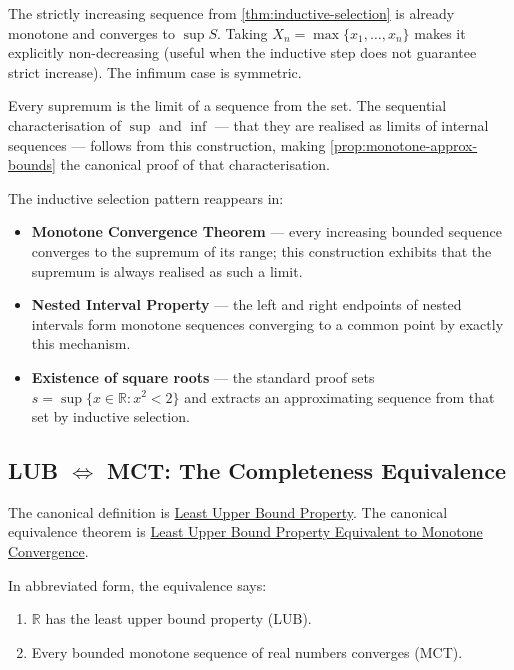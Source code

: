 \begin{remark}
The strictly increasing sequence from \cref{thm:inductive-selection} is
already monotone and converges to $\sup S$. Taking $X_n=\max\{x_1,\ldots,x_n\}$
makes it explicitly non-decreasing (useful when the inductive step does
not guarantee strict increase). The infimum case is symmetric.
\end{remark}

\begin{remark}[Consequence]
Every supremum is the limit of a sequence from the set. The sequential
characterisation of $\sup$ and $\inf$ --- that they are realised as limits
of internal sequences --- follows from this construction, making
\cref{prop:monotone-approx-bounds} the canonical proof of that
characterisation.
\end{remark}

\begin{remark}
The inductive selection pattern reappears in:
\begin{itemize}
  \item \textbf{Monotone Convergence Theorem} --- every increasing bounded
        sequence converges to the supremum of its range; this construction
        exhibits that the supremum is always realised as such a limit.
  \item \textbf{Nested Interval Property} --- the left and right endpoints
        of nested intervals form monotone sequences converging to a common
        point by exactly this mechanism.
  \item \textbf{Existence of square roots} --- the standard proof sets
        $s=\sup\{x\in\mathbb{R}:x^2<2\}$ and extracts an approximating
        sequence from that set by inductive selection.
\end{itemize}
\end{remark}

\subsection*{\texorpdfstring{LUB $\Longleftrightarrow$ MCT: The Completeness Equivalence}{LUB Longleftrightarrow MCT: The Completeness Equivalence}}
\label{subsec:LUB-MCT}

\begin{remark*}
The canonical definition is
\hyperref[def:least-upper-bound-property]{Least Upper Bound Property}. The
canonical equivalence theorem is
\hyperref[thm:lub-property-equivalent-monotone-convergence]{Least Upper Bound
Property Equivalent to Monotone Convergence}.

In abbreviated form, the equivalence says:
\begin{enumerate}[label=(\roman*)]
  \item $\mathbb{R}$ has the least upper bound property (LUB).
  \item Every bounded monotone sequence of real numbers converges (MCT).
\end{enumerate}
\end{remark*}

